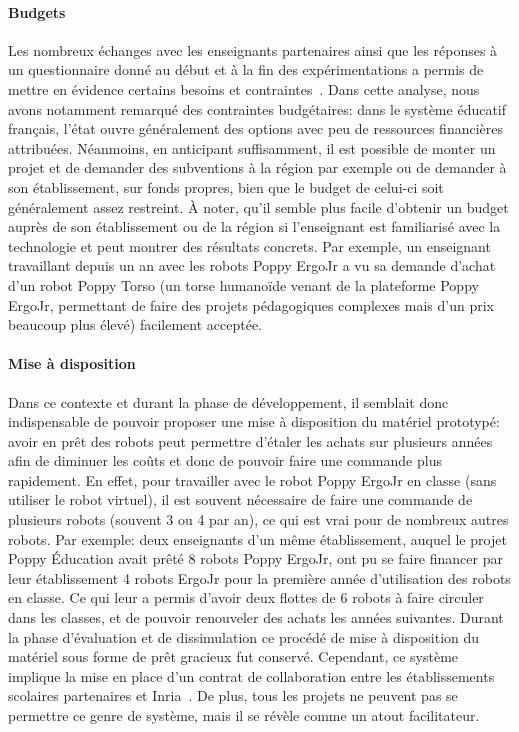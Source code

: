         \paragraph{Budgets}
            Les nombreux échanges avec les enseignants partenaires ainsi que les réponses à un questionnaire donné au début et à la fin des expérimentations a permis de mettre en évidence certains besoins et contraintes~.
            Dans cette analyse, nous avons notamment remarqué des contraintes budgétaires: dans le système éducatif français, l'état ouvre généralement des options avec peu de ressources financières attribuées. Néanmoins, en anticipant suffisamment, il est possible de monter un projet et de demander des subventions à la région par exemple ou de demander à son établissement, sur fonds propres, bien que le budget de celui-ci soit généralement assez restreint.
            À noter, qu'il semble plus facile d'obtenir un budget auprès de son établissement ou de la région si l'enseignant est familiarisé avec la technologie et peut montrer des résultats concrets. Par exemple, un enseignant travaillant depuis un an avec les robots Poppy ErgoJr a vu sa demande d'achat d'un robot Poppy Torso (un torse humanoïde venant de la plateforme Poppy ErgoJr, permettant de faire des projets pédagogiques complexes mais d'un prix beaucoup plus élevé) facilement acceptée.
        \paragraph{Mise à disposition}
            Dans ce contexte et durant la phase de développement, il semblait donc indispensable de pouvoir proposer une mise à disposition du matériel prototypé: avoir en prêt des robots peut permettre d'étaler les achats sur plusieurs années afin de diminuer les coûts et donc de pouvoir faire une commande plus rapidement. En effet, pour travailler avec le robot Poppy ErgoJr en classe (sans utiliser le robot virtuel), il est souvent nécessaire de faire une commande de plusieurs robots (souvent 3 ou 4 par an), ce qui est vrai pour de nombreux autres robots. Par exemple: deux enseignants d'un même établissement, auquel le projet Poppy Éducation avait prêté 8 robots Poppy ErgoJr, ont pu se faire financer par leur établissement 4 robots ErgoJr pour la première année d'utilisation des robots en classe. Ce qui leur a permis d'avoir deux flottes de 6 robots à faire circuler dans les classes, et de pouvoir renouveler des achats les années suivantes.
            Durant la phase d'évaluation et de dissimulation ce procédé de mise à disposition du matériel sous forme de prêt gracieux fut conservé. Cependant, ce système implique la mise en place d'un contrat de collaboration entre les établissements scolaires partenaires et Inria~. De plus, tous les projets ne peuvent pas se permettre ce genre de système, mais il se révèle comme un atout facilitateur.
